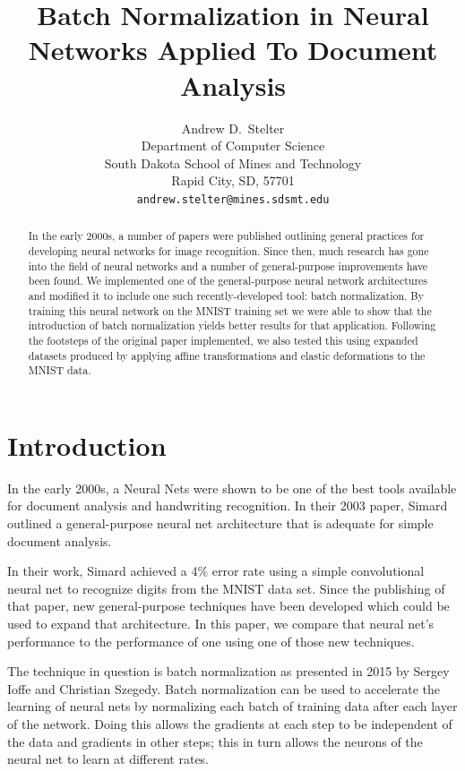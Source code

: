 \documentclass{article}
\title{Batch Normalization in Neural Networks Applied To Document Analysis}
\author{
  Andrew D.~Stelter \\
  Department of Computer Science\\
  South Dakota School of Mines and Technology\\
  Rapid City, SD, 57701 \\
  \texttt{andrew.stelter@mines.sdsmt.edu} \\
}
\begin{document}

\maketitle

\begin{abstract}
  In the early 2000s, a number of papers were published outlining general practices for developing neural networks
  for image recognition. Since then, much research has gone into the field of neural networks and a number of general-purpose improvements have been found. We implemented one of the general-purpose neural network architectures and modified it to include one such recently-developed tool: batch normalization. By training this
  neural network on the MNIST training set we were able to show that the introduction of batch normalization yields better results for that application. Following the footsteps of the original paper implemented, we also tested this using expanded datasets produced by applying affine transformations and elastic deformations to the MNIST data.
\end{abstract}

\section{Introduction}

In the early 2000s, a Neural Nets were shown to be one of the best tools available for
document analysis and handwriting recognition. 
\cite{tay2001offline} \cite{sinha1999improved}
In their 2003 paper, Simard 
\cite{simard2003best} 
outlined a general-purpose neural net architecture that
is adequate for simple document analysis.

In their work, Simard achieved a 4\% error rate using a simple convolutional neural net to recognize digits from the MNIST 
\cite{mnist}
data set. Since the publishing of that paper, new general-purpose techniques have been developed which could be used to expand that architecture. In this paper, we compare that neural net's performance to the performance of one using one of those new techniques.

The technique in question is batch normalization as presented in 2015 by Sergey Ioffe and Christian Szegedy. 
\cite{ioffe2015batch}
Batch normalization can be used to accelerate the learning of neural nets by normalizing each batch of training data after each layer of the network. Doing this allows the gradients at each step to be independent of the data and gradients in other steps; this in turn allows the neurons of the neural net to learn at different rates.
\end{document}
